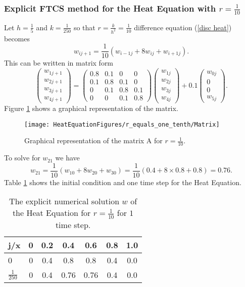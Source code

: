 \begin{example}
\subsubsection{Explicit FTCS method for the Heat Equation with $r=\frac{1}{10}$}
Let $h=\frac{1}{5}$ and $k=\frac{1}{250}$ so that $r=\frac{k}{h^2}=\frac{1}{10}$
difference equation (\ref{disc heat}) becomes
\[
w_{ij+1}=\frac{1}{10}(w_{i-1j}+8w_{ij}+w_{i+1j}).
\]
This can be written in matrix form 
\[
\left(\begin{array}{c}
w_{1j+1}\\
w_{2j+1}\\
w_{3j+1}\\
w_{4j+1}
\end{array}\right)
=
\left(\begin{array}{cccc}
0.8&0.1&0&0\\
0.1&0.8&0.1&0\\
0&0.1&0.8&0.1\\
0&0&0.1&0.8
\end{array}\right)
\left(\begin{array}{c}
w_{1j}\\
w_{2j}\\
w_{3j}\\
w_{4j}
\end{array}\right)+0.1\left(\begin{array}{c}
w_{0j}\\
0\\
0\\
w_{5j}
\end{array}\right).
\]
Figure \ref{Matrix_FTCS_1_10} shows a graphical representation of the matrix.
\begin{figure}[H]
  \caption{Graphical representation of the matrix A for $r=\frac{1}{10}$. }
  \centering
    \texttt{[image: HeatEquationFigures/r\_equals\_one\_tenth/Matrix]}
    \label{Matrix_FTCS_1_10}
\end{figure}
To solve for $w_{21}$ we have
\[w_{21}=\frac{1}{10}(w_{10}+8w_{20}+w_{30})=\frac{1}{10}(0.4+8\times 0.8+0.8)=0.76. \]
Table \ref{Table_FTCS_1_10} shows the initial condition and one time step for the Heat Equation.
\begin{center}
 \begin{table}[H]
 \caption{The explicit numerical solution $w$ of the Heat Equation for $r=\frac{1}{10}$ for $1$ time step.}
 \label{Table_FTCS_1_10}
 \centering
\begin{tabular}{l|cccccc}
j/x&0&0.2&0.4&0.6&0.8&1.0\\ \hline
0&0&0.4&0.8&0.8&0.4&0.0\\
$\frac{1}{250}$&0&0.4&0.76&0.76&0.4&0.0
\end{tabular}
\end{table}
\end{center}


\end{example}
